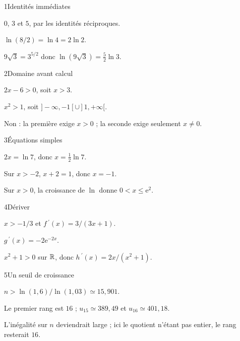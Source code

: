 \begin{corrige}{1}{Identités immédiates}
\begin{questions}
\item $0$, $3$ et $5$, par les identités réciproques.
\item $\ln(8/2)=\ln4=2\ln2$.
\item $9\sqrt3=3^{5/2}$ donc $\ln(9\sqrt3)=\tfrac52\ln3$.
\end{questions}
\end{corrige}
\begin{corrige}{2}{Domaine avant calcul}
\begin{questions}
\item $2x-6>0$, soit $x>3$.
\item $x^2>1$, soit $]-\infty,-1[\cup]1,+\infty[$.
\item Non : la première exige $x>0$ ; la seconde exige seulement $x\ne0$.
\end{questions}
\end{corrige}
\begin{corrige}{3}{Équations simples}
\begin{questions}
\item $2x=\ln7$, donc $x=\tfrac12\ln7$.
\item Sur $x>-2$, $x+2=1$, donc $x=-1$.
\item Sur $x>0$, la croissance de $\ln$ donne $0<x\leq\mathrm e^2$.
\end{questions}
\end{corrige}
\begin{corrige}{4}{Dériver}
\begin{questions}
\item $x>-1/3$ et $f\,\!^{\prime}(x)=3/(3x+1)$.
\item $g\,\!^{\prime}(x)=-2\mathrm e^{-2x}$.
\item $x^2+1>0$ sur $\mathbb{R}$, donc $h\,\!^{\prime}(x)=2x/(x^2+1)$.
\end{questions}
\end{corrige}
\begin{corrige}{5}{Un seuil de croissance}
\begin{questions}
\item $n>\ln(1{,}6)/\ln(1{,}03)\simeq15{,}901$.
\item Le premier rang est $16$ ; $u_{15}\simeq389{,}49$ et $u_{16}\simeq401{,}18$.
\item L’inégalité sur $n$ deviendrait large ; ici le quotient n’étant pas entier, le rang resterait $16$.
\end{questions}
\end{corrige}
